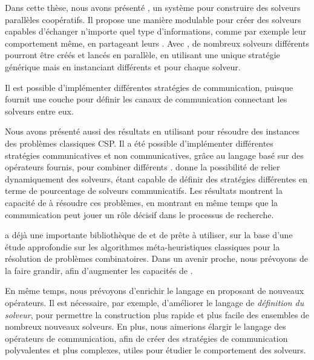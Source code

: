 Dans cette thèse, nous avons présenté \posl{}, un système pour construire des solveurs parallèles coopératifs. Il propose une manière modulable  pour créer des solveurs capables d'échanger n'importe quel type d'informations, comme par exemple leur comportement même, en partageant
leurs \oms. Avec \posl{}, de nombreux solveurs différents pourront être créés et lancés en parallèle, en utilisant une unique stratégie générique mais en instanciant différents \oms{} et \opchs{} pour chaque solveur. 

Il est possible d'implémenter différentes stratégies de communication, puisque \posl{} fournit une couche pour définir les canaux de communication connectant les solveurs entre eux.

Nous avons présenté aussi des résultats en utilisant \posl{} pour résoudre des instances des problèmes classiques CSP. Il a été possible d'implémenter différentes stratégies communicatives et non communicatives, grâce au langage basé sur des opérateurs fournis, pour combiner différents \oms{}. \posl{} donne la possibilité de relier dynamiquement des solveurs, étant capable de définir des stratégies différentes en terme de pourcentage de solveurs communicatifs. Les résultats montrent la capacité de \posl{} à résoudre ces problèmes, en montrant en même temps que la communication peut jouer un rôle décisif dans le processus de recherche.

\posl{} a déjà une importante bibliothèque de \oms{} et de \opchs{} prête à utiliser, sur la base d'une étude approfondie sur les algorithmes méta-heuristiques classiques pour la résolution de problèmes combinatoires. Dans un avenir proche, nous prévoyons de la faire grandir, afin d'augmenter les capacités de \posl.

En même temps, nous prévoyons d'enrichir le langage en proposant de nouveaux opérateurs. Il est nécessaire, par exemple, d'améliorer le langage de {\it définition du solveur}, pour permettre la construction plus rapide et plus facile des ensembles de nombreux nouveaux solveurs. En plus, nous aimerions élargir le langage des opérateurs de communication, afin de créer des stratégies de communication polyvalentes et plus complexes, utiles pour étudier le comportement des solveurs.